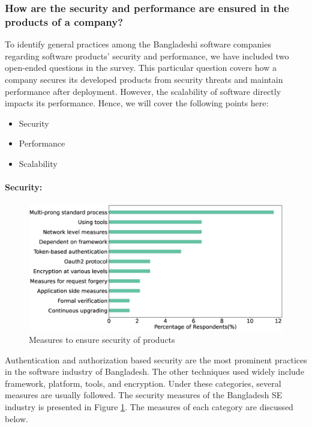 \subsubsection{How are the security and performance are ensured in the products of a company?}
\label{security_performance}

To identify general practices among the Bangladeshi software companies regarding software products' security and performance, we have included two open-ended questions in the survey. This particular question covers how a company secures its developed products from security threats and maintain performance after deployment. However, the scalability of software directly impacts its performance\cite{Liu2009,Bondi2000}. Hence, we will cover the following points here:
\begin{itemize}
    \item Security
    \item Performance
    \item Scalability
\end{itemize}


\paragraph{Security:}
\label{Security}

\begin{figure}[h]
\centering
\includegraphics[scale=0.22]{Figures/Security.eps} 
\caption{Measures to ensure security of products}
\label{fig:Measures to ensure security}
\end{figure}


Authentication and authorization based security are the most prominent practices in the software industry of Bangladesh. The other techniques used widely include framework, platform, tools, and encryption. Under these categories, several measures are usually followed. The security measures of the Bangladesh SE industry is presented in Figure \ref{fig:Measures to ensure security}. The measures of each category are discussed below.

